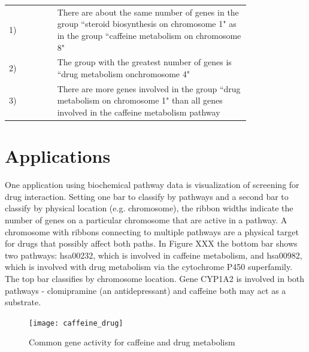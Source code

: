 \begin{tabular}{lp{0.8\linewidth}}
 1) & There are about the same number of genes in the group ``steroid biosynthesis on chromosome 1" as in the group ``caffeine metabolism on chromosome 8"\\
 2) & The group with the greatest number of genes is ``drug metabolism onchromosome 4"\\
 3) & There are more genes involved in the group ``drug metabolism on chromosome 1" than all genes involved in the caffeine metabolism pathway
\end{tabular}

\section{Applications}
One application using biochemical pathway data is visualization of screening for drug interaction. Setting one bar to classify by pathways and a second bar to classify by physical location (e.g. chromosome), the ribbon widths indicate the number of genes on a particular chromosome that are active in a pathway. A chromosome with ribbons connecting to multiple pathways are a physical target for drugs that possibly affect both paths. In Figure XXX the bottom bar shows two pathways: hsa00232, which is involved in caffeine metabolism, and hsa00982, which is involved with drug metabolism via the cytochrome P450 superfamily. The top bar classifies by chromosome location. Gene CYP1A2 is involved in both pathways - clomipramine (an antidepressant) and caffeine both may act as a substrate.
%

\begin{figure}[htbp] %
   \centering
   \texttt{[image: caffeine\_drug]} 
   \caption{Common gene activity for caffeine and drug metabolism}
   \label{fig:caffeine}
\end{figure}


